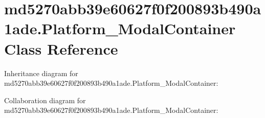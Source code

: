 \hypertarget{classmd5270abb39e60627f0f200893b490a1ade_1_1_platform___modal_container}{}\section{md5270abb39e60627f0f200893b490a1ade.\+Platform\+\_\+\+Modal\+Container Class Reference}
\label{classmd5270abb39e60627f0f200893b490a1ade_1_1_platform___modal_container}


Inheritance diagram for md5270abb39e60627f0f200893b490a1ade.\+Platform\+\_\+\+Modal\+Container\+:


Collaboration diagram for md5270abb39e60627f0f200893b490a1ade.\+Platform\+\_\+\+Modal\+Container\+:
